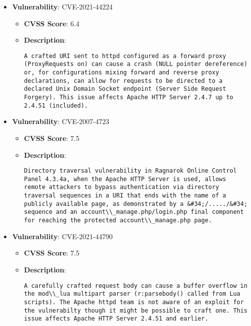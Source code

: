\documentclass{article}
\begin{document}
\begin{itemize}
        \item \textbf{Vulnerability}: CVE-2021-44224
        \begin{itemize}
            \item \textbf{CVSS Score}:  6.4 
            \item \textbf{Description}:
            \parbox[t]{0.9\linewidth}{
                \verb|A crafted URI sent to httpd configured as a forward proxy (ProxyRequests on) can cause a crash (NULL pointer dereference) or, for configurations mixing forward and reverse proxy declarations, can allow for requests to be directed to a declared Unix Domain Socket endpoint (Server Side Request Forgery). This issue affects Apache HTTP Server 2.4.7 up to 2.4.51 (included).|
            }
        \end{itemize}
    
        \item \textbf{Vulnerability}: CVE-2007-4723
        \begin{itemize}
            \item \textbf{CVSS Score}:  7.5 
            \item \textbf{Description}:
            \parbox[t]{0.9\linewidth}{
                \verb|Directory traversal vulnerability in Ragnarok Online Control Panel 4.3.4a, when the Apache HTTP Server is used, allows remote attackers to bypass authentication via directory traversal sequences in a URI that ends with the name of a publicly available page, as demonstrated by a &#34;/...../&#34; sequence and an account\\_manage.php/login.php final component for reaching the protected account\\_manage.php page.|
            }
        \end{itemize}
    
        \item \textbf{Vulnerability}: CVE-2021-44790
        \begin{itemize}
            \item \textbf{CVSS Score}:  7.5 
            \item \textbf{Description}:
            \parbox[t]{0.9\linewidth}{
                \verb|A carefully crafted request body can cause a buffer overflow in the mod\\_lua multipart parser (r:parsebody() called from Lua scripts). The Apache httpd team is not aware of an exploit for the vulnerabilty though it might be possible to craft one. This issue affects Apache HTTP Server 2.4.51 and earlier.|
            }
        \end{itemize}
    

\end{itemize}
\end{document}
